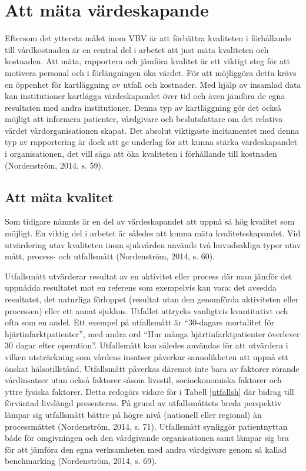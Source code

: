 \section{Att mäta värdeskapande}

Eftersom det yttersta målet inom VBV är att förbättra kvaliteten i förhållande till vårdkostnaden är en central del i arbetet att just mäta kvaliteten och kostnaden. Att mäta, rapportera och jämföra kvalitet är ett viktigt steg för att motivera personal och i förlängningen öka värdet. För att möjliggöra detta krävs en öppenhet för kartläggning av utfall och kostnader. Med hjälp av insamlad data kan institutioner kartlägga värdeskapandet över tid och även jämföra de egna resultaten med andra institutioner. Denna typ av kartläggning gör det också möjligt att informera patienter, vårdgivare och beslutsfattare om det relativa värdet vårdorganisationen skapat. Det absolut viktigaste incitamentet med denna typ av rapportering är dock att ge underlag för att kunna stärka värdeskapandet i organisationen, det vill säga att öka kvaliteten i förhållande till kostnaden (Nordenström, 2014, s. 59).

\subsection{Att mäta kvalitet}

Som tidigare nämnts är en del av värdeskapandet  att uppnå så hög kvalitet som möjligt. En viktig del i arbetet är således att kunna mäta kvalitetsskapandet. Vid utvärdering utav kvaliteten inom sjukvården används två huvudsakliga typer utav mått, process- och utfallsmått (Nordenström, 2014, s. 60).
 
Utfallsmått utvärderar resultat av en aktivitet eller process där man jämför det uppnådda resultatet mot en referens som exempelvis kan vara: det avsedda resultatet, det naturliga förloppet (resultat utan den genomförda aktiviteten eller processen) eller ett annat sjukhus. Utfallet uttrycks vanligtvis kvantitativt och ofta som en andel. Ett exempel på utfallsmått är “30-dagars mortalitet för hjärtinfarktpatienter”, med andra ord “Hur många hjärtinfarktpatienter överlever 30 dagar efter operation”. Utfallsmått kan således användas för att utvärdera i vilken utsträckning som vårdens insatser påverkar sannolikheten att uppnå ett önskat hälsotillstånd. Utfallsmått påverkas däremot inte bara av faktorer rörande vårdinsatser utan också faktorer såsom livsstil, socioekonomiska faktorer och yttre fysiska faktorer. Detta redogörs vidare för i Tabell \ref{utfallsh} där bidrag till förväntad livslängd presenteras. På grund av utfallsmåttets breda perspektiv lämpar sig utfallsmått bättre på högre nivå (nationell eller regional) än processmåttet (Nordenström, 2014, s. 71). Utfallsmått synliggör patientnyttan både för omgivningen och den vårdgivande organisationen samt lämpar sig bra för att jämföra den egna verksamheten med andra vårdgivare genom så kallad benchmarking (Nordenström, 2014, s. 69).
 
